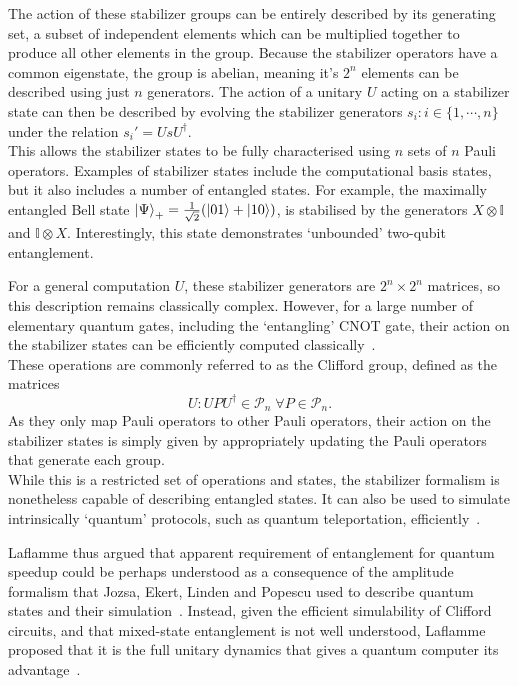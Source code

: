 \documentclass{standalone}
\begin{document}
The action of these stabilizer groups can be entirely described by its generating set, a subset of independent elements which can be multiplied together to produce all other elements in the group. Because the stabilizer operators have a common eigenstate, the group is abelian, meaning it's $2^{n}$ elements can be described using just $n$ generators. The action of a unitary $U$ acting on a stabilizer state can then be described by evolving the stabilizer generators $s_{i}:i\in\{1,\cdots, n\}$ under the relation $s_{i}' = UsU^{\dagger}$. \\
This allows the stabilizer states to be fully characterised using $n$ sets of $n$ Pauli operators. Examples of stabilizer states include the computational basis states, but it also includes a number of entangled states. For example, the maximally entangled Bell state $\ket{\Psi}_{+}=\frac{1}{\sqrt{2}}(\ket{01}+\ket{10})$, is stabilised by the generators $X\otimes \mathbb{I}$ and $\mathbb{I}\otimes X$. Interestingly, this state demonstrates `unbounded' two-qubit entanglement.
\par
For a general computation $U$, these stabilizer generators are $2^{n}\times2^{n}$ matrices, so this description remains classically complex. However, for a large number of elementary quantum gates, including the `entangling' CNOT gate, their action on the stabilizer states can be efficiently computed classically~\cite{Gottesman1999a}.\\
These operations are commonly referred to as the Clifford group, defined as the matrices~\cite{Gottesman1999a}
\begin{equation}\label{eq:Clifford}
U:UPU^{\dagger}\in\mathcal{P}_{n}\;\forall P\in\mathcal{P}_{n}.
\end{equation}
As they only map Pauli operators to other Pauli operators, their action on the stabilizer states is simply given by appropriately updating the Pauli operators that generate each group. \\
While this is a restricted set of operations and states, the stabilizer formalism is nonetheless capable of describing entangled states. It can also be used to simulate intrinsically `quantum' protocols, such as quantum teleportation, efficiently~\cite{Aaronson2004a}.
\par
Laflamme thus argued that apparent requirement of entanglement for quantum speedup could be perhaps understood as a consequence of the amplitude formalism that Jozsa, Ekert, Linden and Popescu used to describe quantum states and their simulation~\cite{Laflamme2001}. Instead, given the efficient simulability of Clifford circuits, and that mixed-state entanglement is not well understood, Laflamme proposed that it is the full unitary dynamics that gives a quantum computer its advantage~\cite{Laflamme2001}.
\end{document}
